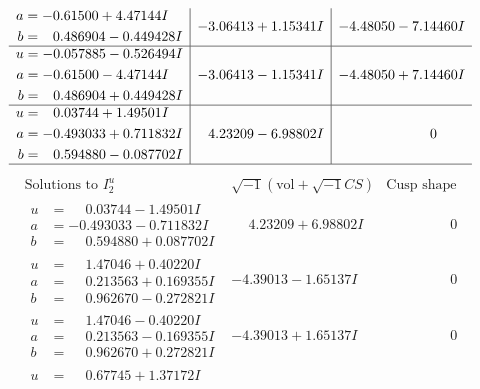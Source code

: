 \documentclass[1p]{elsarticle_modified}
\theoremstyle{definition}
\newcommand{\I}{\sqrt{-1}}
\begin{document}
$$\begin{array}{c|c|c}
\begin{aligned}
a &= -0.61500 + 4.47144 I \\
b &= \phantom{-}0.486904 - 0.449428 I\end{aligned}
 & -3.06413 + 1.15341 I & -4.48050 - 7.14460 I \\ \hline\begin{aligned}
u &= -0.057885 - 0.526494 I \\
a &= -0.61500 - 4.47144 I \\
b &= \phantom{-}0.486904 + 0.449428 I\end{aligned}
 & -3.06413 - 1.15341 I & -4.48050 + 7.14460 I \\ \hline\begin{aligned}
u &= \phantom{-}0.03744 + 1.49501 I \\
a &= -0.493033 + 0.711832 I \\
b &= \phantom{-}0.594880 - 0.087702 I\end{aligned}
 & \phantom{-}4.23209 - 6.98802 I & \phantom{-0.000000 } 0\\
 \hline 
 \end{array}$$\newpage$$\begin{array}{c|c|c}  
\text{Solutions to }I^u_{2}& \I (\text{vol} + \sqrt{-1}CS) & \text{Cusp shape}\\
 \hline 
\begin{aligned}
u &= \phantom{-}0.03744 - 1.49501 I \\
a &= -0.493033 - 0.711832 I \\
b &= \phantom{-}0.594880 + 0.087702 I\end{aligned}
 & \phantom{-}4.23209 + 6.98802 I & \phantom{-0.000000 } 0 \\ \hline\begin{aligned}
u &= \phantom{-}1.47046 + 0.40220 I \\
a &= \phantom{-}0.213563 + 0.169355 I \\
b &= \phantom{-}0.962670 - 0.272821 I\end{aligned}
 & -4.39013 - 1.65137 I & \phantom{-0.000000 } 0 \\ \hline\begin{aligned}
u &= \phantom{-}1.47046 - 0.40220 I \\
a &= \phantom{-}0.213563 - 0.169355 I \\
b &= \phantom{-}0.962670 + 0.272821 I\end{aligned}
 & -4.39013 + 1.65137 I & \phantom{-0.000000 } 0 \\ \hline\begin{aligned}
u &= \phantom{-}0.67745 + 1.37172 I \\

\end{aligned}
\end{array}$$
\end{document}
